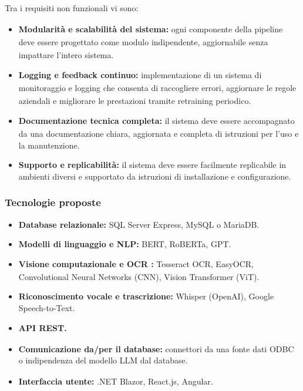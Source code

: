 \documentclass[a4paper,11pt]{article}
\begin{document}
Tra i requisiti\textsubscript{}
 non funzionali\textsubscript{}
 vi sono:
\begin{itemize}
 \item \textbf{Modularità\textsubscript{} e scalabilità\textsubscript{} del sistema:} ogni componente della pipeline deve essere progettato come modulo\textsubscript{} indipendente, aggiornabile senza impattare l'intero sistema.
 \item \textbf{Logging e feedback continuo:} implementazione\textsubscript{} di un sistema di monitoraggio e logging che consenta di raccogliere errori\textsubscript{}, aggiornare le regole aziendali e migliorare le prestazioni tramite retraining periodico.
 \item \textbf{Documentazione\textsubscript{}
 tecnica completa:} il sistema deve essere accompagnato da una documentazione chiara, aggiornata e completa di istruzioni per l'uso e la manutenzione.
 \item \textbf{Supporto e replicabilità:} il sistema deve essere facilmente replicabile in ambienti diversi e supportato da istruzioni di installazione e configurazione.
\end{itemize}
\subsubsection{Tecnologie proposte}
\begin{itemize}[noitemsep, topsep=0pt]
 \item \textbf{Database relazionale:} SQL Server Express, MySQL o MariaDB.
 \item \textbf{Modelli di linguaggio e NLP:} BERT, RoBERTa, GPT.
 \item \textbf{Visione computazionale e OCR\textsubscript{}
:} Tesseract OCR, EasyOCR, Convolutional Neural Networks (CNN), Vision Transformer (ViT).
 \item \textbf{Riconoscimento vocale e trascrizione:} Whisper (OpenAI), Google Speech-to-Text.
 \item \textbf{API\textsubscript{}
 REST.}
 \item \textbf{Comunicazione da/per il database:} connettori da una fonte dati ODBC o indipendenza del modello LLM\textsubscript{}
 dal database.
 \item \textbf{Interfaccia\textsubscript{} utente:} .NET Blazor, React.js, Angular\textsubscript{}.
\end{itemize}
\end{document}
